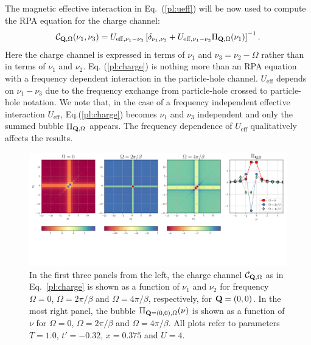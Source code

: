 The magnetic effective interaction in Eq.~(\ref{pl:ueff}) will be now used to compute the RPA equation for the charge channel:
\begin{equation}
\mathcal{C}_{\mathbf{Q},\Omega} (\nu_1,\nu_3) = U_{\mathrm{eff},\nu_1-\nu_3} \left[ \delta_{\nu_1,\nu_3} + U_{\mathrm{eff},\nu_1-\nu_3}\Pi_{\mathbf{Q},\Omega}(\nu_1) \right]^{-1}.
\label{pl:charge}
\end{equation}
Here the charge channel is expressed in terms of $\nu_1$ and $\nu_3=\nu_2-\Omega$ rather than in terms of $\nu_1$ and $\nu_2$.
Eq. (\ref{pl:charge}) is nothing more than an RPA equation with a frequency dependent interaction in the particle-hole channel.\cite{Rohringer2012} $U_{\mathrm{eff}}$ depends on $\nu_1-\nu_3$ due to the frequency exchange from particle-hole crossed to particle-hole notation.
We note that, in the case of a frequency independent effective interaction $U_{\mathrm{eff}}$, Eq.(\ref{pl:charge}) becomes $\nu_1$ and $\nu_3$ independent 
and only the summed bubble $\Pi_{\mathbf{Q},\Omega}$ appears.
The frequency dependence of $U_{\mathrm{eff}}$ qualitatively affects the results. 

\begin{figure}
\includegraphics[width=\textwidth]{images/PL_all.png}
\vspace*{-2.0cm}
\caption{In the first three panels from the left, the charge channel $\mathcal{C}_{\mathbf{Q},\Omega}$ as in Eq.~\ref{pl:charge} is shown as 
a function of $\nu_1$ and $\nu_2$ for frequency $\Omega=0$, $\Omega=2\pi/ \beta$ and 
$\Omega=4\pi/ \beta$, respectively, for $\mathbf{Q}=(0,0)$. In the most right panel, the bubble $\Pi_{\mathbf{Q}=(0,0),\Omega}(\nu)$ is shown as a function of $\nu$ for 
$\Omega=0$, $\Omega=2\pi/ \beta$ and $\Omega=4\pi/ \beta$. All plots refer to parameters $T=1.0$, $t'=-0.32$, $x=0.375$ and $U=4$.  } 
\label{fig:perpladder}
\end{figure}

